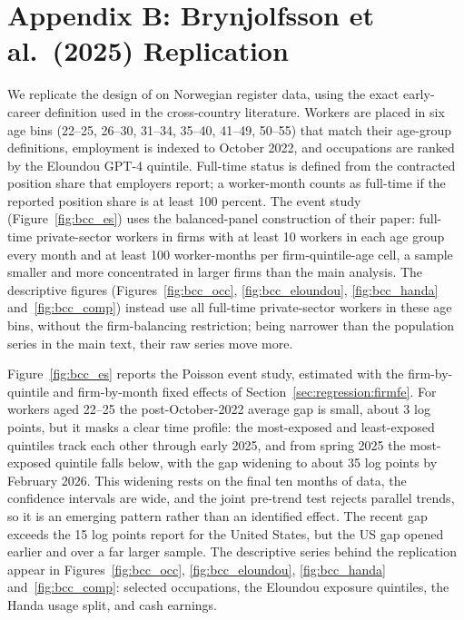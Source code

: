 \documentclass[12pt]{article}
\begin{document}



\clearpage
{}
{}
\section*{Appendix B: Brynjolfsson et al.\ (2025) Replication}\label{app:bcc}
\setcounter{figure}{0}
\renewcommand{\thefigure}{B\arabic{figure}}
\setcounter{table}{0}
\renewcommand{\thetable}{B\arabic{table}}

We replicate the design of \citet{brynjolfsson2025} on Norwegian register data, using the exact early-career definition used in the cross-country literature. Workers are placed in six age bins (22--25, 26--30, 31--34, 35--40, 41--49, 50--55) that match their age-group definitions, employment is indexed to October 2022, and occupations are ranked by the Eloundou GPT-4 quintile. Full-time status is defined from the contracted position share that employers report; a worker-month counts as full-time if the reported position share is at least 100 percent. The event study (Figure~\ref{fig:bcc_es}) uses the balanced-panel construction of their paper: full-time private-sector workers in firms with at least 10 workers in each age group every month and at least 100 worker-months per firm-quintile-age cell, a sample smaller and more concentrated in larger firms than the main analysis. The descriptive figures (Figures~\ref{fig:bcc_occ}, \ref{fig:bcc_eloundou}, \ref{fig:bcc_handa} and~\ref{fig:bcc_comp}) instead use all full-time private-sector workers in these age bins, without the firm-balancing restriction; being narrower than the population series in the main text, their raw series move more.

Figure~\ref{fig:bcc_es} reports the Poisson event study, estimated with the firm-by-quintile and firm-by-month fixed effects of Section~\ref{sec:regression:firmfe}. For workers aged 22--25 the post-October-2022 average gap is small, about 3 log points, but it masks a clear time profile: the most-exposed and least-exposed quintiles track each other through early 2025, and from spring 2025 the most-exposed quintile falls below, with the gap widening to about 35 log points by February 2026. This widening rests on the final ten months of data, the confidence intervals are wide, and the joint pre-trend test rejects parallel trends, so it is an emerging pattern rather than an identified effect. The recent gap exceeds the 15 log points \citet{brynjolfsson2025} report for the United States, but the US gap opened earlier and over a far larger sample. The descriptive series behind the replication appear in Figures~\ref{fig:bcc_occ}, \ref{fig:bcc_eloundou}, \ref{fig:bcc_handa} and~\ref{fig:bcc_comp}: selected occupations, the Eloundou exposure quintiles, the Handa usage split, and cash earnings.
\end{document}
